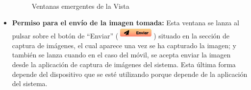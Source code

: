 \begin{itemize}
\begin{figure}
    \centering
    \hspace{5mm}
    \hfill
\caption{Ventanas emergentes de la Vista}
\end{figure}


\item \textbf{Permiso para el envío de la imagen tomada:} Esta ventana se lanza al pulsar sobre el botón de ``Enviar'' (\includegraphics[width=0.15\textwidth]{imagenes/07_Implementacion/boton_enviar.png}) situado en la sección de captura de imágenes, el cual aparece una vez se ha capturado la imagen; y también se lanza cuando en el caso del móvil, se acepta enviar la imagen desde la aplicación de captura de imágenes del sistema. Esta última forma depende del dispositivo que se esté utilizando porque depende de la aplicación del sistema.


\end{itemize}
